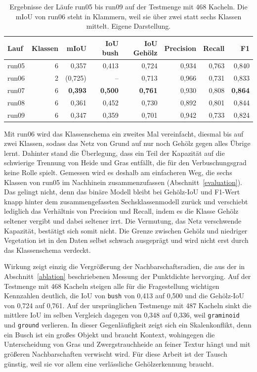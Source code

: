\begin{table}[H]
    \centering
    \caption[Ergebnisse der Läufe run05 bis run09]{Ergebnisse der Läufe run05
    bis run09 auf der Testmenge mit 468 Kacheln. Die mIoU von run06 steht in
    Klammern, weil sie über zwei statt sechs Klassen mittelt.
    Eigene Darstellung.}
    \label{tab:ablation_b}
    \begin{tabular}{lrrrrrrr}
    \hline
    Lauf & Klassen & mIoU & IoU bush & IoU Gehölz & Precision & Recall & F1 \\
    \hline
    run05 & 6 & 0,357 & 0,413 & 0,724 & 0,934 & 0,763 & 0,840 \\
    run06 & 2 & (0,725) & -- & 0,713 & 0,966 & 0,731 & 0,833 \\
    run07 & 6 & \textbf{0,393} & \textbf{0,500} & \textbf{0,761} & 0,930 & 0,808 & \textbf{0,864} \\
    run08 & 6 & 0,361 & 0,452 & 0,730 & 0,892 & 0,801 & 0,844 \\
    run09 & 6 & 0,347 & 0,359 & 0,701 & 0,942 & 0,733 & 0,824 \\
    \hline
    \end{tabular}
\end{table}

Mit run06 wird das Klassenschema ein zweites Mal vereinfacht, diesmal bis auf zwei Klassen, sodass das Netz von Grund auf nur noch Gehölz gegen alles Übrige lernt. Dahinter stand die Überlegung, dass ein Teil der Kapazität auf die schwierige Trennung von Heide und Gras entfällt, die für den Verbuschungsgrad keine Rolle spielt. Gemessen wird es deshalb am einfacheren Weg, die sechs Klassen von run05 im Nachhinein zusammenzufassen (Abschnitt~\ref{evaluation}). Das gelingt nicht, denn das binäre Modell bleibt bei Gehölz-IoU und F1-Wert knapp hinter dem zusammengefassten Sechsklassenmodell zurück und verschiebt lediglich das Verhältnis von Precision und Recall, indem es die Klasse Gehölz seltener vergibt und dabei seltener irrt. Die Vermutung, das Netz verschwende Kapazität, bestätigt sich somit nicht. Die Grenze zwischen Gehölz und niedriger Vegetation ist in den Daten selbst schwach ausgeprägt und wird nicht erst durch das Klassenschema verdeckt.

Wirkung zeigt einzig die Vergrößerung der Nachbarschaftsradien, die aus der in Abschnitt~\ref{ablation} beschriebenen Messung der Punktdichte hervorging. Auf der Testmenge mit 468 Kacheln steigen alle für die Fragestellung wichtigen Kennzahlen deutlich, die IoU von \texttt{bush} von 0,413 auf 0,500 und die Gehölz-IoU von 0,724 auf 0,761. Auf der ursprünglichen Testmenge mit 487 Kacheln sinkt die mittlere IoU im selben Vergleich dagegen von 0,348 auf 0,336, weil \texttt{graminoid} und \texttt{ground} verlieren. In dieser Gegenläufigkeit zeigt sich ein Skalenkonflikt, denn ein Busch ist ein großes Objekt und braucht Kontext, wohingegen die Unterscheidung von Gras und Zwergstrauchheide an feiner Textur hängt und mit größeren Nachbarschaften verwischt wird. Für diese Arbeit ist der Tausch günstig, weil sie vor allem eine verlässliche Gehölzerkennung braucht.


